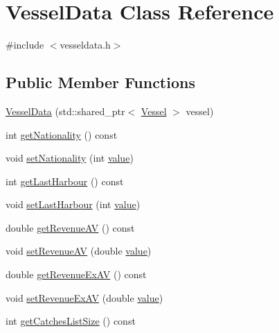 \hypertarget{class_vessel_data}{}\section{Vessel\+Data Class Reference}
\label{class_vessel_data}


{\ttfamily \#include $<$vesseldata.\+h$>$}

\subsection*{Public Member Functions}
\begin{DoxyCompactItemize}
\item 
\mbox{\hyperlink{class_vessel_data_ac3ac114dde67f0763a7c3030762ce879}{Vessel\+Data}} (std\+::shared\+\_\+ptr$<$ \mbox{\hyperlink{class_vessel}{Vessel}} $>$ vessel)
\item 
int \mbox{\hyperlink{class_vessel_data_a3ea2adb9b065c2bc2650796263ae1e74}{get\+Nationality}} () const
\item 
void \mbox{\hyperlink{class_vessel_data_a063991ce28cb21af606e2b05ea4c46fe}{set\+Nationality}} (int \mbox{\hyperlink{diffusion_8cpp_a4b41795815d9f3d03abfc739e666d5da}{value}})
\item 
int \mbox{\hyperlink{class_vessel_data_a08fd4872dd7b6f03e9fdd3339cc8f26b}{get\+Last\+Harbour}} () const
\item 
void \mbox{\hyperlink{class_vessel_data_af2443b2444a36efa305038834e2ba75e}{set\+Last\+Harbour}} (int \mbox{\hyperlink{diffusion_8cpp_a4b41795815d9f3d03abfc739e666d5da}{value}})
\item 
double \mbox{\hyperlink{class_vessel_data_aaee49878d727a62ffa75a4b428977126}{get\+Revenue\+AV}} () const
\item 
void \mbox{\hyperlink{class_vessel_data_a2edcd215e18c0b631423667215904088}{set\+Revenue\+AV}} (double \mbox{\hyperlink{diffusion_8cpp_a4b41795815d9f3d03abfc739e666d5da}{value}})
\item 
double \mbox{\hyperlink{class_vessel_data_aac6c29044a2c779fc9812160f76fa8c4}{get\+Revenue\+Ex\+AV}} () const
\item 
void \mbox{\hyperlink{class_vessel_data_a3104c210688e4307e32b39b4f31d7a3f}{set\+Revenue\+Ex\+AV}} (double \mbox{\hyperlink{diffusion_8cpp_a4b41795815d9f3d03abfc739e666d5da}{value}})
\item 
int \mbox{\hyperlink{class_vessel_data_a36b2927e5e749d13c2f625e6ff8fbdba}{get\+Catches\+List\+Size}} () const
\item 

\end{DoxyCompactItemize}
